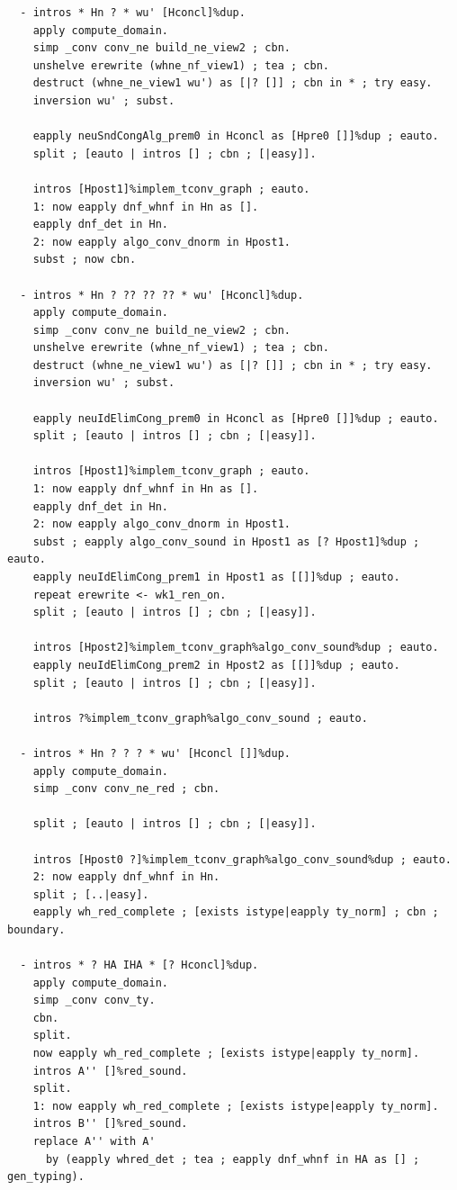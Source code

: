 \begin{lstlisting}
  - intros * Hn ? * wu' [Hconcl]%dup.
    apply compute_domain.
    simp _conv conv_ne build_ne_view2 ; cbn.
    unshelve erewrite (whne_nf_view1) ; tea ; cbn.
    destruct (whne_ne_view1 wu') as [|? []] ; cbn in * ; try easy.
    inversion wu' ; subst.

    eapply neuSndCongAlg_prem0 in Hconcl as [Hpre0 []]%dup ; eauto.
    split ; [eauto | intros [] ; cbn ; [|easy]].

    intros [Hpost1]%implem_tconv_graph ; eauto.
    1: now eapply dnf_whnf in Hn as [].
    eapply dnf_det in Hn.
    2: now eapply algo_conv_dnorm in Hpost1.
    subst ; now cbn.

  - intros * Hn ? ?? ?? ?? * wu' [Hconcl]%dup.
    apply compute_domain.
    simp _conv conv_ne build_ne_view2 ; cbn.
    unshelve erewrite (whne_nf_view1) ; tea ; cbn.
    destruct (whne_ne_view1 wu') as [|? []] ; cbn in * ; try easy.
    inversion wu' ; subst.

    eapply neuIdElimCong_prem0 in Hconcl as [Hpre0 []]%dup ; eauto.
    split ; [eauto | intros [] ; cbn ; [|easy]].

    intros [Hpost1]%implem_tconv_graph ; eauto.
    1: now eapply dnf_whnf in Hn as [].
    eapply dnf_det in Hn.
    2: now eapply algo_conv_dnorm in Hpost1.
    subst ; eapply algo_conv_sound in Hpost1 as [? Hpost1]%dup ; eauto.
    eapply neuIdElimCong_prem1 in Hpost1 as [[]]%dup ; eauto.
    repeat erewrite <- wk1_ren_on.
    split ; [eauto | intros [] ; cbn ; [|easy]].

    intros [Hpost2]%implem_tconv_graph%algo_conv_sound%dup ; eauto.
    eapply neuIdElimCong_prem2 in Hpost2 as [[]]%dup ; eauto.
    split ; [eauto | intros [] ; cbn ; [|easy]].

    intros ?%implem_tconv_graph%algo_conv_sound ; eauto.

  - intros * Hn ? ? ? * wu' [Hconcl []]%dup.
    apply compute_domain.
    simp _conv conv_ne_red ; cbn.

    split ; [eauto | intros [] ; cbn ; [|easy]].

    intros [Hpost0 ?]%implem_tconv_graph%algo_conv_sound%dup ; eauto.
    2: now eapply dnf_whnf in Hn.
    split ; [..|easy].
    eapply wh_red_complete ; [exists istype|eapply ty_norm] ; cbn ; boundary.
  
  - intros * ? HA IHA * [? Hconcl]%dup.
    apply compute_domain.
    simp _conv conv_ty.
    cbn.
    split.
    now eapply wh_red_complete ; [exists istype|eapply ty_norm].
    intros A'' []%red_sound.
    split.
    1: now eapply wh_red_complete ; [exists istype|eapply ty_norm].
    intros B'' []%red_sound.
    replace A'' with A'
      by (eapply whred_det ; tea ; eapply dnf_whnf in HA as [] ; gen_typing).


\end{lstlisting}
